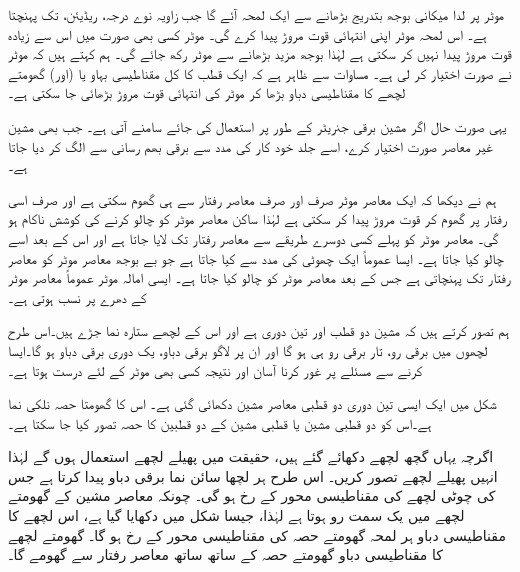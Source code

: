 موٹر پر لدا میکانی بوجھ بتدریج بڑھانے سے ایک لمحہ آئے گا  جب زاویہ  نوے درجہ،   ریڈیئن، تک پہنچتا ہے۔ اس لمحہ موٹر اپنی انتہائی قوت مروڑ  پیدا کرے  گی۔ موٹر کسی بھی صورت میں اس سے زیادہ قوت مروڑ پیدا نہیں کر سکتی ہے لہٰذا  بوجھ  مزید بڑھانے سے موٹر رکھ جائے گی۔ ہم کہتے ہیں کہ موٹر نے  صورت اختیار کر لی ہے۔ مساوات  سے ظاہر ہے کہ ایک قطب کا کل مقناطیسی بہاو یا (اور) گھومتے لچھے کا مقناطیسی دباو بڑھا کر موٹر کی  انتہائی قوت مروڑ  بڑھائی جا سکتی ہے۔

یہی صورت  حال اگر مشین برقی جنریٹر کے طور پر استعمال کی جائے سامنے آتی ہے۔ جب بھی مشین غیر معاصر صورت اختیار کرے،  اسے جلد خود کار   کی مدد سے برقی بھم  رسانی سے الگ کر دیا جاتا ہے۔

ہم نے دیکھا کہ ایک معاصر موٹر صرف اور صرف معاصر رفتار سے ہی گھوم سکتی ہے اور صرف اسی رفتار پر گھوم کر قوت مروڑ پیدا کر سکتی ہے لہٰذا ساکن معاصر موٹر کو  چالو  کرنے کی کوشش  ناکام ہو گی۔ معاصر موٹر کو پہلے کسی دوسرے طریقے سے معاصر رفتار تک لایا جاتا ہے اور اس کے بعد  اسے چالو کیا جاتا ہے۔ ایسا عموماً ایک چھوٹی   کی مدد سے کیا جاتا ہے جو بے بوجھ معاصر موٹر کو  معاصر رفتار تک پہنچاتی  ہے جس کے بعد معاصر موٹر کو چالو کیا جاتا ہے۔ ایسی امالہ موٹر عموماً معاصر موٹر کے دھرے پر نسب ہوتی ہے۔

 ہم تصور کرتے ہیں کہ مشین دو قطب اور تین دوری ہے اور اس کے لچھے ستارہ نما جڑے  ہیں۔اس طرح لچھوں میں برقی رو، تار برقی رو ہی ہو گا اور ان پر لاگو برقی دباو، یک دوری برقی دباو ہو گا۔ایسا کرنے سے مسئلے پر غور کرنا آسان  اور نتیجہ کسی بھی موٹر کے لئے درست ہوتا ہے۔

شکل   میں ایک ایسی تین دوری دو قطبی معاصر مشین دکھائی گئی ہے۔ اس کا گھومتا حصہ نلکی نما ہے۔اس کو دو قطبی مشین یا   قطبی مشین کے دو قطبین کا حصہ تصور کیا جا سکتا ہے۔

 اگرچہ یہاں گچھ لچھے دکھائے گئے ہیں، حقیقت میں پھیلے لچھے  استعمال ہوں گے لہٰذا انہیں  پھیلے لچھے تصور کریں۔ اس طرح ہر لچھا سائن نما برقی دباو پیدا کرتا ہے جس کی چوٹی لچھے کی مقناطیسی محور کے رخ ہو گی۔  چونکہ معاصر مشین کے گھومتے لچھے میں یک سمت  رو ہوتا ہے لہٰذا، جیسا شکل  میں دکھایا گیا ہے، اس لچھے  کا مقناطیسی دباو ہر لمحہ گھومتے حصہ کی مقناطیسی محور کے رخ ہو گا۔ گھومتے لچھے کا مقناطیسی دباو گھومتے حصہ کے ساتھ ساتھ معاصر رفتار سے گھومے گا۔

